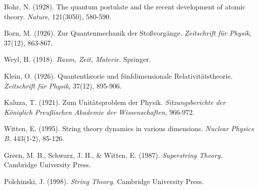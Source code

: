 \documentclass[12pt,a4paper]{article}
\begin{document}
\begin{thebibliography}{99}
Bohr, N. (1928). The quantum postulate and the recent development of atomic theory. \textit{Nature}, 121(3050), 580-590.

Born, M. (1926). Zur Quantenmechanik der Stoßvorgänge. \textit{Zeitschrift für Physik}, 37(12), 863-867.

Weyl, H. (1918). \textit{Raum, Zeit, Materie}. Springer.

Klein, O. (1926). Quantentheorie und fünfdimensionale Relativitätstheorie. \textit{Zeitschrift für Physik}, 37(12), 895-906.

Kaluza, T. (1921). Zum Unitätsproblem der Physik. \textit{Sitzungsberichte der Königlich Preußischen Akademie der Wissenschaften}, 966-972.

Witten, E. (1995). String theory dynamics in various dimensions. \textit{Nuclear Physics B}, 443(1-2), 85-126.

Green, M. B., Schwarz, J. H., \& Witten, E. (1987). \textit{Superstring Theory}. Cambridge University Press.

Polchinski, J. (1998). \textit{String Theory}. Cambridge University Press.

\end{thebibliography}
\end{document}
